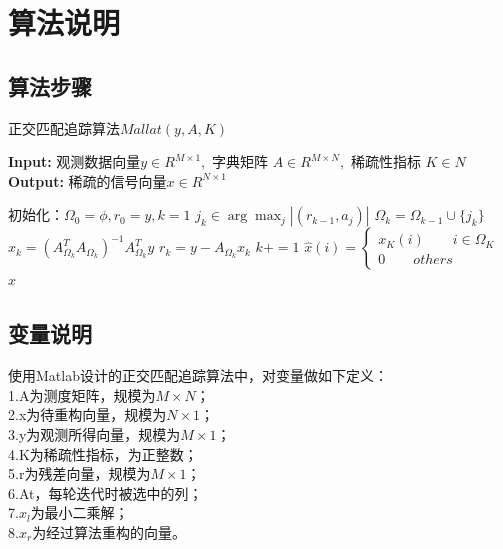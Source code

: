 \documentclass{article}
\begin{document}
\section{算法说明}
\subsection{算法步骤}
	\begin{algorithm}[H]
		\caption{正交匹配追踪算法$ Mallat(y,A,K) $} 
		\hspace*{0.02in} {\bf Input:} 
		观测数据向量$ y\in R^{M\times 1},$ 字典矩阵 $ A \in R^{M\times N},$ 稀疏性指标 $K\in N$\\
		\hspace*{0.02in} {\bf Output:} 
		稀疏的信号向量$ x \in R^{N\times 1}$ 
		\begin{algorithmic}[1]
			\State 初始化：$ \Omega_0=\phi,r_0=y,k=1 $ 
			\State $ j_k\in \arg{\max_j{|(r_{k-1},a_j)|}} $
			\State $ \Omega_k = \Omega_{k-1}\cup \{j_k\} $
			\State $ x_k = (A_{\Omega_k}^{T}A_{\Omega_k})^{-1}A_{\Omega_k}^{T}y $
			\State $ r_k = y-A_{\Omega_k}x_k $
			\State $ k += 1 $
			\EndWhile
			\State $  \hat{x}(i) = \left\{
			\begin{aligned}
				x_K(i) \qquad i\in \Omega_K\\
				0 \qquad others
			\end{aligned} 
			\right. $
			\State \Return $ \hat{x} $
		\end{algorithmic}
	\end{algorithm}
\subsection{变量说明}
使用Matlab设计的正交匹配追踪算法中，对变量做如下定义：\\
1.A为测度矩阵，规模为$ M\times N $；\\
2.x为待重构向量，规模为$ N\times 1 $；\\
3.y为观测所得向量，规模为$ M\times 1 $；\\
4.K为稀疏性指标，为正整数；\\
5.r为残差向量，规模为$ M\times 1 $；\\
6.At，每轮迭代时被选中的列；\\
7.$ x_l $为最小二乘解；\\
8.$ x_r $为经过算法重构的向量。
\end{document}
